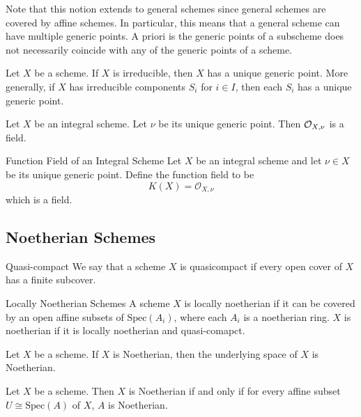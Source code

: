 \documentclass[a4paper]{article}
\begin{document}
Note that this notion extends to general schemes since general schemes are covered by affine schemes. In particular, this means that a general scheme can have multiple generic points. A priori is the generic points of a subscheme does not necessarily coincide with any of the generic points of a scheme. 

\begin{prp}{}{} Let $X$ be a scheme. If $X$ is irreducible, then $X$ has a unique generic point. More generally, if $X$ has irreducible components $S_i$ for $i\in I$, then each $S_i$ has a unique generic point. 
\end{prp}

\begin{prp}{}{} Let $X$ be an integral scheme. Let $\nu$ be its unique generic point. Then $\mathcal{O}_{X,\nu}$ is a field. 
\end{prp}

\begin{defn}{Function Field of an Integral Scheme}{} Let $X$ be an integral scheme and let $\nu\in X$ be its unique generic point. Define the function field to be $$K(X)=\mathcal{O}_{X,\nu}$$ which is a field. 
\end{defn}

\subsection{Noetherian Schemes}
\begin{defn}{Quasi-compact}{} We say that a scheme $X$ is quasicompact if every open cover of $X$ has a finite subcover. 
\end{defn}

\begin{defn}{Locally Noetherian Schemes}{} A scheme $X$ is locally noetherian if it can be covered by an open affine subsets of $\text{Spec}(A_i)$, where each $A_i$ is a noetherian ring. $X$ is noetherian if it is locally noetherian and quasi-comapct. 
\end{defn}

\begin{lmm}{}{} Let $X$ be a scheme. If $X$ is Noetherian, then the underlying space of $X$ is Noetherian. 
\end{lmm}

\begin{prp}{}{} Let $X$ be a scheme. Then $X$ is Noetherian if and only if for every affine subset $U\cong\text{Spec}(A)$ of $X$, $A$ is Noetherian. 
\end{prp}
\end{document}
